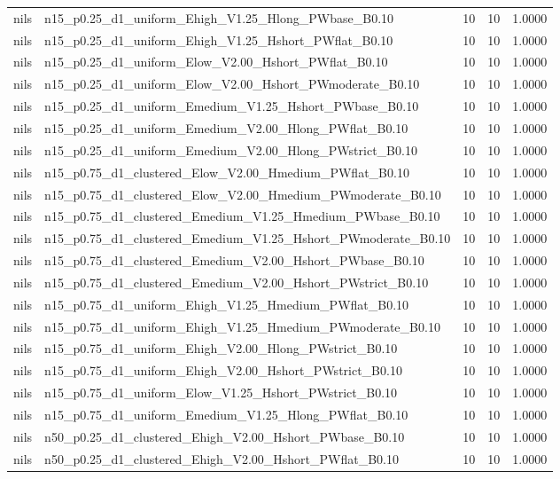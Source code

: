 \begin{tabular}{llrrr}
nils & n15_p0.25_d1_uniform_Ehigh_V1.25_Hlong_PWbase_B0.10 & 10 & 10 & 1.0000 \\
nils & n15_p0.25_d1_uniform_Ehigh_V1.25_Hshort_PWflat_B0.10 & 10 & 10 & 1.0000 \\
nils & n15_p0.25_d1_uniform_Elow_V2.00_Hshort_PWflat_B0.10 & 10 & 10 & 1.0000 \\
nils & n15_p0.25_d1_uniform_Elow_V2.00_Hshort_PWmoderate_B0.10 & 10 & 10 & 1.0000 \\
nils & n15_p0.25_d1_uniform_Emedium_V1.25_Hshort_PWbase_B0.10 & 10 & 10 & 1.0000 \\
nils & n15_p0.25_d1_uniform_Emedium_V2.00_Hlong_PWflat_B0.10 & 10 & 10 & 1.0000 \\
nils & n15_p0.25_d1_uniform_Emedium_V2.00_Hlong_PWstrict_B0.10 & 10 & 10 & 1.0000 \\
nils & n15_p0.75_d1_clustered_Elow_V2.00_Hmedium_PWflat_B0.10 & 10 & 10 & 1.0000 \\
nils & n15_p0.75_d1_clustered_Elow_V2.00_Hmedium_PWmoderate_B0.10 & 10 & 10 & 1.0000 \\
nils & n15_p0.75_d1_clustered_Emedium_V1.25_Hmedium_PWbase_B0.10 & 10 & 10 & 1.0000 \\
nils & n15_p0.75_d1_clustered_Emedium_V1.25_Hshort_PWmoderate_B0.10 & 10 & 10 & 1.0000 \\
nils & n15_p0.75_d1_clustered_Emedium_V2.00_Hshort_PWbase_B0.10 & 10 & 10 & 1.0000 \\
nils & n15_p0.75_d1_clustered_Emedium_V2.00_Hshort_PWstrict_B0.10 & 10 & 10 & 1.0000 \\
nils & n15_p0.75_d1_uniform_Ehigh_V1.25_Hmedium_PWflat_B0.10 & 10 & 10 & 1.0000 \\
nils & n15_p0.75_d1_uniform_Ehigh_V1.25_Hmedium_PWmoderate_B0.10 & 10 & 10 & 1.0000 \\
nils & n15_p0.75_d1_uniform_Ehigh_V2.00_Hlong_PWstrict_B0.10 & 10 & 10 & 1.0000 \\
nils & n15_p0.75_d1_uniform_Ehigh_V2.00_Hshort_PWstrict_B0.10 & 10 & 10 & 1.0000 \\
nils & n15_p0.75_d1_uniform_Elow_V1.25_Hshort_PWstrict_B0.10 & 10 & 10 & 1.0000 \\
nils & n15_p0.75_d1_uniform_Emedium_V1.25_Hlong_PWflat_B0.10 & 10 & 10 & 1.0000 \\
nils & n50_p0.25_d1_clustered_Ehigh_V2.00_Hshort_PWbase_B0.10 & 10 & 10 & 1.0000 \\
nils & n50_p0.25_d1_clustered_Ehigh_V2.00_Hshort_PWflat_B0.10 & 10 & 10 & 1.0000 \\

\end{tabular}

